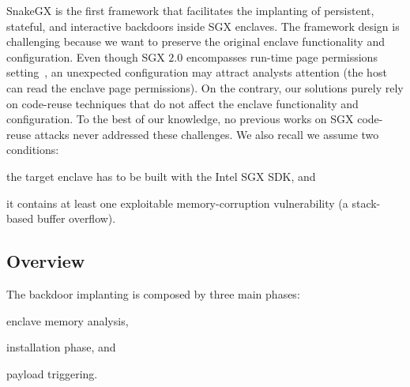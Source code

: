 SnakeGX is the first framework that facilitates the implanting of persistent, 
stateful, and interactive backdoors inside SGX enclaves.
The framework design is challenging because we want to preserve the original
enclave functionality and configuration.
Even though SGX $2.0$ encompasses run-time page permissions 
setting~\cite{intel-sgx2}, an unexpected configuration may attract analysts 
attention (\ie the host can read the enclave page permissions).
On the contrary, our solutions purely rely on code-reuse techniques that do not
affect the enclave functionality and configuration.
To the best of our knowledge, no previous works on SGX code-reuse attacks
never addressed these challenges.
We also recall we assume two conditions:
\begin{enumerate*}[label=(\roman*)]
	\item the target enclave has to be built with the Intel SGX SDK, 
	and
	\item it contains at least one exploitable memory-corruption 
	vulnerability (\eg a stack-based buffer overflow).
\end{enumerate*}



\subsection{Overview}
\label{ssec:overview-attack}

The backdoor implanting is composed by three main phases:
\begin{enumerate*}[label=(\roman*)]
	\item enclave memory analysis,
	\item installation phase, and
	\item payload triggering.
\end{enumerate*}

